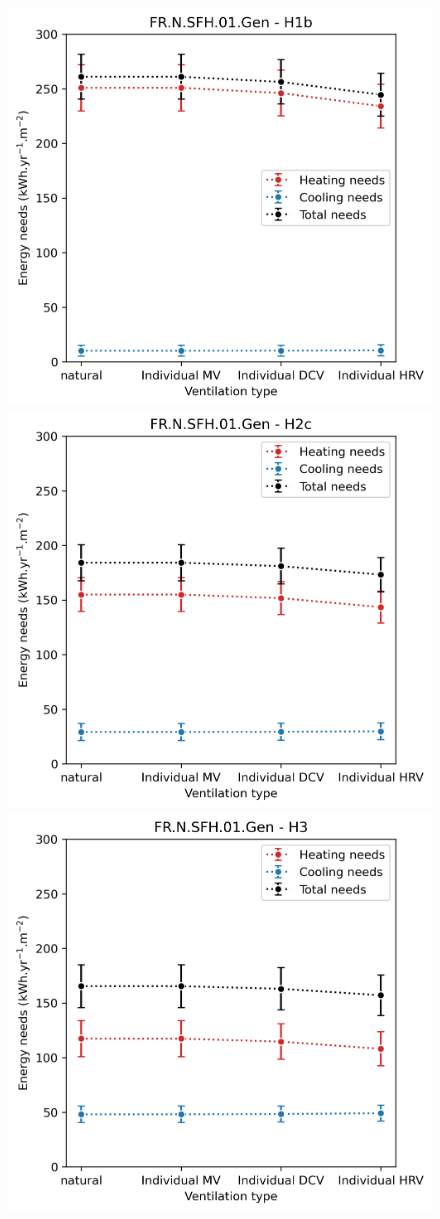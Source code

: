 \documentclass[11pt]{article}
\begin{document}
            \begin{figure}[ht]
                \centering
                \includegraphics[width=0.32\columnwidth]{figures/ventilation_FR.N.SFH.01.Gen_H1b_conventionnel_th-bce_2020_2000-2020.png}
                \includegraphics[width=0.32\columnwidth]{figures/ventilation_FR.N.SFH.01.Gen_H2c_conventionnel_th-bce_2020_2000-2020.png}
                \includegraphics[width=0.32\columnwidth]{figures/ventilation_FR.N.SFH.01.Gen_H3_conventionnel_th-bce_2020_2000-2020.png}\\

\end{figure}
\end{document}

